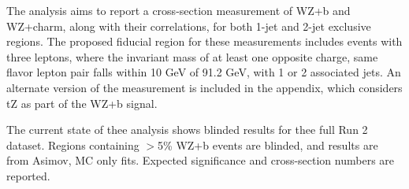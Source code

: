 The analysis aims to report a cross-section measurement of WZ+b and WZ+charm, along with their correlations, for both 1-jet and 2-jet exclusive regions. The proposed fiducial region for these measurements includes events with three leptons, where the invariant mass of at least one opposite charge, same flavor lepton pair falls within 10 GeV of 91.2 GeV, with 1 or 2 associated jets. An alternate version of the measurement is included in the appendix, which considers tZ as part of the WZ+b signal.

The current state of thee analysis shows blinded results for thee full Run 2 dataset. Regions containing $>$5\% WZ+b events are blinded, and results are from Asimov, MC only fits. Expected significance and cross-section numbers are reported.
